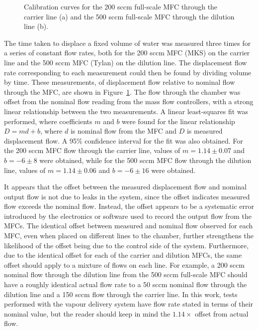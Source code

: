 \documentclass[
  a4paper,
]{scrbook}
\begin{document}
\begin{figure}
\begin{minipage}[t]{0.47\linewidth}
{{}

}

\subcaption{\label{fig-500-MFC-curve}}
\end{minipage}%

\caption{\label{fig-MFC-calibration-curves}Calibration curves for the
200 sccm full-scale MFC through the carrier line (a) and the 500 sccm
full-scale MFC through the dilution line (b).}

\end{figure}

The time taken to displace a fixed volume of water was measured three
times for a series of constant flow rates, both for the 200 sccm MFC
(MKS) on the carrier line and the 500 sccm MFC (Tylan) on the dilution
line. The displacement flow rate corresponding to each measurement could
then be found by dividing volume by time. These measurements, of
displacement flow relative to nominal flow through the MFC, are shown in
Figure~\ref{fig-MFC-calibration-curves}. The flow through the chamber
was offset from the nominal flow reading from the mass flow controllers,
with a strong linear relationship between the two measurements. A linear
least-squares fit was performed, where coefficients \(m\) and \(b\) were
found for the linear relationship \(D = md + b\), where \(d\) is nominal
flow from the MFC and \(D\) is measured displacement flow. A 95\%
confidence interval for the fit was also obtained. For the 200 sccm MFC
flow through the carrier line, values of \(m = 1.14\pm0.07\) and
\(b = -6\pm8\) were obtained, while for the 500 sccm MFC flow through
the dilution line, values of \(m = 1.14\pm0.06\) and \(b = -6\pm16\)
were obtained.

It appears that the offset between the measured displacement flow and
nominal output flow is not due to leaks in the system, since the offset
indicates measured flow exceeds the nominal flow. Instead, the offset
appears to be a systematic error introduced by the electronics or
software used to record the output flow from the MFCs. The identical
offset between measured and nominal flow observed for each MFC, even
when placed on different lines to the chamber, further strengthens the
likelihood of the offset being due to the control side of the system.
Furthermore, due to the identical offset for each of the carrier and
dilution MFCs, the same offset should apply to a mixture of flows on
each line. For example, a 200 sccm nominal flow through the dilution
line from the 500 sccm full-scale MFC should have a roughly identical
actual flow rate to a 50 sccm nominal flow through the dilution line and
a 150 sccm flow through the carrier line. In this work, tests performed
with the vapour delivery system have flow rate stated in terms of their
nominal value, but the reader should keep in mind the \(1.14 \times\)
offset from actual flow.
\end{document}
